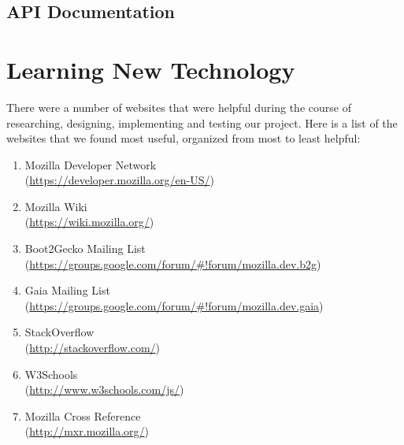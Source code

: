 \documentclass[12pt]{article}
\begin{document}
\subsection{API Documentation}

\pagebreak

\section{Learning New Technology}
There were a number of websites that were helpful during the course of researching, designing, implementing and testing our project. Here is a list of the websites that we found most useful, organized from most to least helpful:
\begin{enumerate}
	\item Mozilla Developer Network\\ (\href{https://developer.mozilla.org/en-US/}{https://developer.mozilla.org/en-US/})
	\item Mozilla Wiki\\ (\href{https://wiki.mozilla.org/}{https://wiki.mozilla.org/})
	\item Boot2Gecko Mailing List\\ (\href{https://groups.google.com/forum/\#!forum/mozilla.dev.b2g}{https://groups.google.com/forum/\#!forum/mozilla.dev.b2g})
	\item Gaia Mailing List\\ (\href{https://groups.google.com/forum/\#!forum/mozilla.dev.gaia}{https://groups.google.com/forum/\#!forum/mozilla.dev.gaia})
	\item StackOverflow\\ (\href{http://stackoverflow.com/}{http://stackoverflow.com/})
	\item W3Schools\\ (\href{http://www.w3schools.com/js/}{http://www.w3schools.com/js/}) 
	\item Mozilla Cross Reference\\ (\href{http://mxr.mozilla.org/}{http://mxr.mozilla.org/})
\end{enumerate}
	
\end{document}
